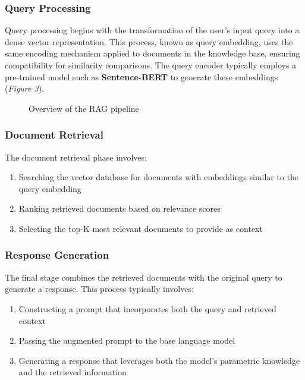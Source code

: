\documentclass[12pt]{article}
\begin{document}
    \newpage

    \subsubsection{Query Processing}
    Query processing begins with the transformation of the user's input query into a dense vector representation. 
    This process, known as query embedding, uses the same encoding mechanism applied to documents in the knowledge 
    base, ensuring compatibility for similarity comparisons. The query encoder typically employs a pre-trained model 
    such as \textbf{Sentence-BERT} \cite{sentence_bert} to generate these embeddings (\textit{Figure 3}).

    \begin{figure}[h!]
        \vspace{1cm}
        \centering
        \caption{Overview of the RAG pipeline \cite{prompt_engineering}}
    \end{figure}

    \subsubsection{Document Retrieval}
    The document retrieval phase involves:
    \begin{enumerate}
    \item Searching the vector database for documents with embeddings similar to the query embedding
    \item Ranking retrieved documents based on relevance scores
    \item Selecting the top-K most relevant documents to provide as context
    \end{enumerate}

    \subsubsection{Response Generation}
    The final stage combines the retrieved documents with the original query to generate a response. 
    This process typically involves:
    \begin{enumerate}
        \item Constructing a prompt that incorporates both the query and retrieved context
        \item Passing the augmented prompt to the base language model
        \item Generating a response that leverages both the model's parametric knowledge and the retrieved information
    \end{enumerate}
\end{document}
